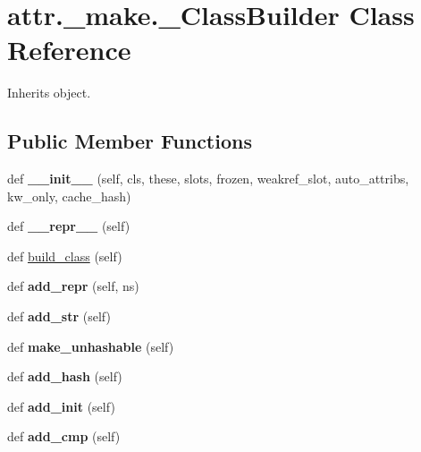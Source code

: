 \hypertarget{classattr_1_1__make_1_1___class_builder}{}\section{attr.\+\_\+make.\+\_\+\+Class\+Builder Class Reference}
\label{classattr_1_1__make_1_1___class_builder}


Inherits object.

\subsection*{Public Member Functions}
\begin{DoxyCompactItemize}
\item 
\mbox{\label{classattr_1_1__make_1_1___class_builder_ad8dfb476e85f40d3ae770e7138dd8513}} 
def {\bfseries \+\_\+\+\_\+init\+\_\+\+\_\+} (self, cls, these, slots, frozen, weakref\+\_\+slot, auto\+\_\+attribs, kw\+\_\+only, cache\+\_\+hash)
\item 
\mbox{\label{classattr_1_1__make_1_1___class_builder_a818334f45d059f032daf8939a0e94758}} 
def {\bfseries \+\_\+\+\_\+repr\+\_\+\+\_\+} (self)
\item 
def \hyperlink{classattr_1_1__make_1_1___class_builder_a21e6abffb1b71a1a93ac693331cccb22}{build\+\_\+class} (self)
\item 
\mbox{\label{classattr_1_1__make_1_1___class_builder_aa7f2851a5bc4702d1b13eae255671300}} 
def {\bfseries add\+\_\+repr} (self, ns)
\item 
\mbox{\label{classattr_1_1__make_1_1___class_builder_af7a1236c2ba8ed20da7d474051342dbc}} 
def {\bfseries add\+\_\+str} (self)
\item 
\mbox{\label{classattr_1_1__make_1_1___class_builder_a5224fae710e3c50146bdb179a3a5afd6}} 
def {\bfseries make\+\_\+unhashable} (self)
\item 
\mbox{\label{classattr_1_1__make_1_1___class_builder_a58220918c41c8d1c75de40dd4562b747}} 
def {\bfseries add\+\_\+hash} (self)
\item 
\mbox{\label{classattr_1_1__make_1_1___class_builder_a8faad24ce359ea6666980c6134bf5220}} 
def {\bfseries add\+\_\+init} (self)
\item 
\mbox{\label{classattr_1_1__make_1_1___class_builder_a5ef3dc078aaafa256fd3dc966fd4f7b0}} 
def {\bfseries add\+\_\+cmp} (self)
\end{DoxyCompactItemize}


